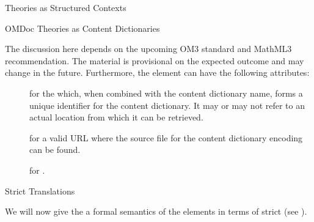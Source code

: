 \begin{omgroup}[short=Mathematical Statements,id=statements]
\begin{omgroup}[id=theories-contexts]{Theories as Structured Contexts}
\begin{module}[id=theories]
\begin{omgroup}[id=identifying]{OMDoc Theories as Content Dictionaries}
\begin{oldpart}{The discussion here depends on the upcoming OM3 standard and MathML3
    recommendation. The material is provisional on the expected outcome and may change in
    the future.}
Furthermore, the {} element can have the following attributes:
\begin{description}
\item[] for the {} which, when
  combined with the content dictionary name, forms a unique identifier for the content
  dictionary. It may or may not refer to an actual location from which it can be
  retrieved.
\item[] for a valid URL where the source file for the content
  dictionary encoding can be found.
\item[] for .
\end{description}
\end{oldpart}
\end{omgroup}
\end{module}
\end{omgroup}

\begin{omgroup}[id=st.strict]{Strict Translations}

  We will now give the a formal semantics
  of the {} elements in terms of strict {\omdoc} (see
  {}).


\end{omgroup}
\end{omgroup}
